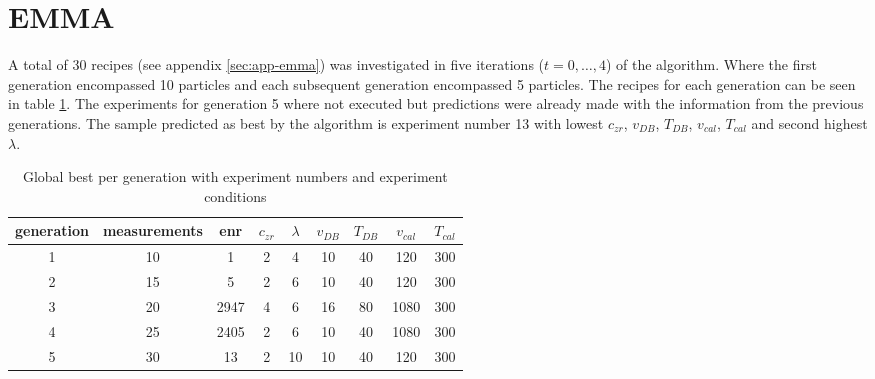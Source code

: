 \section{EMMA}
\label{sec:res-emma}
A total of 30 recipes (see appendix \ref{sec:app-emma}) was investigated in 
five iterations ($t = 0, \dots, 4$) of the algorithm. 
Where the first generation encompassed 10 particles and each subsequent generation encompassed 5 particles. 
The  recipes for each generation can be seen in table \ref{tab:emma-Gb}. 
The experiments for generation 5 where not executed but 
predictions were already made
with the information from the previous generations. 
The sample predicted as best by the algorithm is experiment number 13 with 
lowest $c_{zr}$, $v_{DB}$, $T_{DB}$, $v_{cal}$, $T_{cal}$ and second highest $\lambda$. 

\begin{table}[htb]
	\centering
	\caption{Global best per generation with experiment numbers and experiment conditions}%
	\label{tab:emma-Gb}
	\begin{tabular}{ccccccccc}
        \hline\hline
		generation& measurements &enr &$c_{zr}$ &$\lambda$ &$v_{DB}$ &$T_{DB}$ &$v_{cal}$ &$T_{cal}$\\
        \hline
	1  &10	&1       &2    &4   &10   &40  &120  &300\\
	2  &15	&5       &2    &6   &10   &40  &120  &300\\
	3  &20	&2947    &4    &6   &16   &80 &1080  &300\\
	4  &25	&2405    &2    &6   &10   &40 &1080  &300\\
	5  &30	&13      &2   &10   &10   &40  &120  &300\\
    \hline\hline
	\end{tabular}
\end{table}

